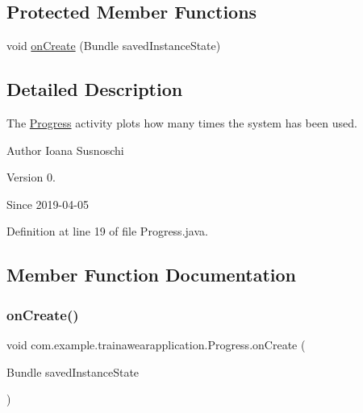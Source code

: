 \subsection*{Protected Member Functions}
\begin{DoxyCompactItemize}
\item 
void \mbox{\hyperlink{classcom_1_1example_1_1trainawearapplication_1_1_progress_a839ad2f2cb526d70b32c517f54400f36}{on\+Create}} (Bundle saved\+Instance\+State)
\end{DoxyCompactItemize}


\subsection{Detailed Description}
The \mbox{\hyperlink{classcom_1_1example_1_1trainawearapplication_1_1_progress}{Progress}} activity plots how many times the system has been used. 

\begin{DoxyAuthor}{Author}
Ioana Susnoschi 
\end{DoxyAuthor}
\begin{DoxyVersion}{Version}
0. 
\end{DoxyVersion}
\begin{DoxySince}{Since}
2019-\/04-\/05 
\end{DoxySince}


Definition at line 19 of file Progress.\+java.



\subsection{Member Function Documentation}
\mbox{\label{classcom_1_1example_1_1trainawearapplication_1_1_progress_a839ad2f2cb526d70b32c517f54400f36}} 
\subsubsection{\texorpdfstring{onCreate()}{onCreate()}}
{\footnotesize\ttfamily void com.\+example.\+trainawearapplication.\+Progress.\+on\+Create (\begin{DoxyParamCaption}\item[{Bundle}]{saved\+Instance\+State }\end{DoxyParamCaption})\hspace{0.3cm}{\ttfamily [protected]}}




